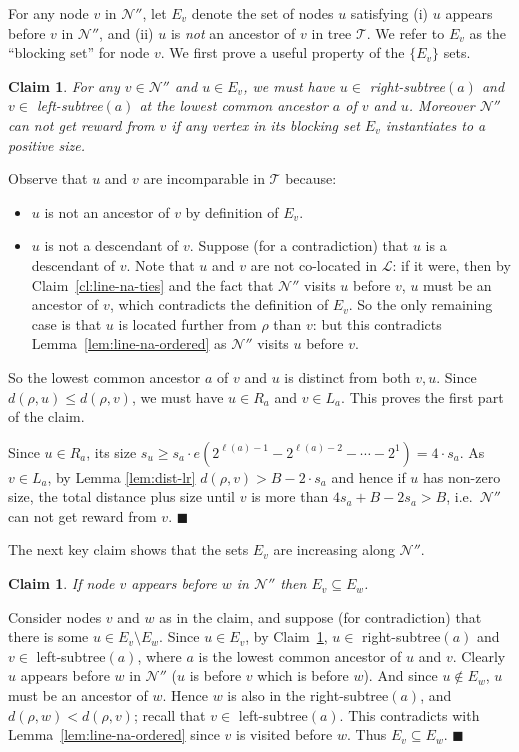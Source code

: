 \documentclass[11pt,letterpaper]{article}
\newtheorem{claim}[theorem]{Claim}
\numberwithin{algorithm}{section}
\newenvironment{proof}{

\noindent{\bf Proof:}}
{\hfill$\blacksquare$


}
\newcommand{\lm}[0]{{\ensuremath{\mathcal{L}}}\xspace}
\newcommand{\N}[0]{{\ensuremath{\mathcal{N}}}\xspace}
\newcommand{\sse}{\subseteq}
\newcommand{\T}{\ensuremath{\mathcal{T}}\xspace}
\newcommand{\q}[1]{e\left(#1\right)}
\begin{document}
For any node $v$ in $\N''$, let $E_v$ denote the set of nodes $u$ satisfying (i) $u$ appears before $v$ in $\N''$, and (ii) $u$ is {\em not} an ancestor of $v$ in tree \T. We refer to $E_v$ as the ``blocking set'' for node $v$. We first prove a useful property of the  $\{E_v\}$ sets.
\begin{claim}\label{cl:line-E-prop}
For any $v\in \N''$ and $u\in E_v$, we must have $u\in$ right-subtree$(a)$ and $v\in$ left-subtree$(a)$ at the lowest common ancestor $a$ of $v$ and $u$. Moreover $\N''$ can not get reward from $v$ if any vertex in its blocking set $E_v$ instantiates to a positive size.
\end{claim}
\begin{proof}
Observe that $u$ and $v$ are incomparable in \T because:
\begin{itemize}
\item $u$ is not an ancestor of $v$ by definition of $E_v$.
\item $u$ is not a descendant of $v$. Suppose (for a contradiction) that $u$ is a descendant of $v$. Note that $u$ and $v$ are not co-located in \lm: if it were, then by  Claim~\ref{cl:line-na-ties} and the fact that $\N''$ visits $u$ before $v$, $u$ must be an ancestor of $v$, which contradicts the definition of $E_v$. So the only remaining case is that $u$ is located further from $\rho$ than $v$: but this contradicts Lemma~\ref{lem:line-na-ordered} as $\N''$ visits $u$ before $v$.
\end{itemize}
So the lowest common ancestor $a$ of $v$ and $u$ is distinct from both $v,u$. Since $d(\rho,u)\le d(\rho,v)$, we must have $u\in R_a$ and $v\in L_a$. This proves the first part of the claim.

Since $u\in R_a$, its size $s_u\ge s_a\cdot \q{2^{\ell(a)-1} - 2^{\ell(a)-2}-\cdots -2^1} = 4\cdot s_a$.
As $v \in L_a$, by Lemma \ref{lem:dist-lr} $d(\rho,v)> B-2\cdot s_a$  and hence if $u$ has non-zero size, the total distance plus size until $v$ is more than $4s_a+B-2s_a>B$, i.e.~$\N''$ can not get reward from $v$.
\end{proof}

The next key claim shows that the sets $E_v$ are increasing along $\N''$.
\begin{claim}\label{cl:inc-E}
If node $v$ appears before $w$ in $\N''$ then $E_v\sse E_w$.
\end{claim}
\begin{proof}
Consider nodes $v$ and $w$ as in the claim, and suppose (for contradiction) that there is some $u\in E_v\setminus E_w$. Since $u\in E_v$, by Claim~\ref{cl:line-E-prop}, $u\in$ right-subtree$(a)$ and $v\in$ left-subtree$(a)$, where $a$ is the lowest common ancestor of $u$ and $v$. Clearly $u$ appears before $w$ in $\N''$ ($u$ is before $v$ which is before $w$). And since $u \not\in E_w$, $u$ must be an ancestor of $w$. Hence $w$ is also in the right-subtree$(a)$, and $d(\rho,w)<d(\rho,v)$;  recall that $v\in$ left-subtree$(a)$. This contradicts with Lemma~\ref{lem:line-na-ordered} since $v$ is visited before $w$. Thus $E_v\sse E_w$.
\end{proof}
\end{document}

